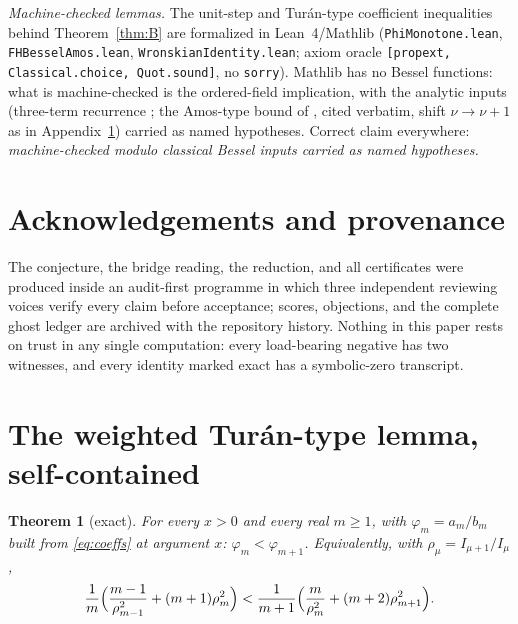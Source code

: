 \documentclass[11pt]{article}
\newtheorem{theorem}{Theorem}
\theoremstyle{remark}
\begin{document}
\begin{sloppypar}
\emph{Machine-checked lemmas.} The unit-step and Tur\'an-type coefficient
inequalities behind Theorem~\ref{thm:B} are formalized in Lean~4/Mathlib
(\texttt{PhiMonotone.lean}, \texttt{FHBesselAmos.lean},
\texttt{WronskianIdentity.lean}; axiom oracle
\texttt{[propext, Classical.choice, Quot.sound]}, no \texttt{sorry}).
Mathlib has no Bessel functions: what is machine-checked is the
ordered-field implication, with the analytic inputs (three-term
recurrence \cite[10.29.1]{DLMF}; the Amos-type bound of
\cite{Amos,Segura2011,RuizSegura}, cited verbatim, shift
$\nu\to\nu+1$ as in Appendix~\ref{app:phi}) carried as named
hypotheses. Correct claim everywhere: \emph{machine-checked modulo
classical Bessel inputs carried as named hypotheses.}
\end{sloppypar}

\section*{Acknowledgements and provenance}
The conjecture, the bridge reading, the reduction, and all certificates
were produced inside an audit-first programme in which three independent
reviewing voices verify every claim before acceptance; scores,
objections, and the complete ghost ledger are archived with the
repository history. Nothing in this paper rests on trust in any single
computation: every load-bearing negative has two witnesses, and every
identity marked exact has a symbolic-zero transcript.

\appendix

\section{The weighted Tur\'an-type lemma, self-contained}\label{app:phi}

\begin{theorem}[exact]\label{thm:phi}
For every $x>0$ and every real $m\ge1$, with $\varphi_m=a_m/b_m$ built
from \eqref{eq:coeffs} at argument $x$:\; $\varphi_m<\varphi_{m+1}$.
Equivalently, with $\rho_\mu=I_{\mu+1}/I_\mu$,
\[
\frac1m\Bigl(\frac{m-1}{\rho_{m-1}^2}+(m+1)\rho_m^2\Bigr)
<\frac1{m+1}\Bigl(\frac{m}{\rho_m^2}+(m+2)\rho_{m+1}^2\Bigr).
\]
\end{theorem}
\end{document}
